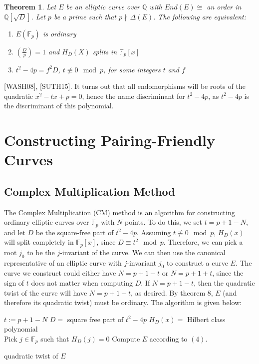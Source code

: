 \documentclass[12pt,twoside]{article}
\newcommand{\legendre}[2]{\genfrac{(}{)}{}{}{#1}{#2}}
\newtheorem{theorem}{Theorem}
\begin{document}
\begin{theorem}
Let $E$ be an elliptic curve over $\mathbb Q$ with $End(E) \cong $ an order in $\mathbb Q[\sqrt D]$. Let $p$ be a prime such that $p \nmid \, \Delta(E)$. The following are equivalent:
\begin{enumerate} 
\item $E(\mathbb F_p)$ is ordinary
\item $\legendre{D}{p} = 1$ and $H_D(X)$ splits in $\mathbb F_p[x]$
\item $t^2 - 4p = f^2 D$, $t \not \equiv 0 \mod p$, for some integers $t$ and $f$
\end{enumerate}
\end{theorem}
[WASH08], [SUTH15].
It turns out that all endomorphisms will be roots of the quadratic $x^{2} - tx + p = 0$, hence the name discriminant for $t^{2} - 4p$, as $t^2 - 4p$ is the discriminant of this polynomial.


\section{Constructing Pairing-Friendly Curves} 

\subsection{Complex Multiplication Method} 

The Complex Multiplication (CM) method is an algorithm for constructing ordinary elliptic curves over $\mathbb F_p$ with $N$ points. To do this, we set $t = p+1 - N$, and let $D$ be the square-free part of $t^2-4p$. Assuming $t \not \equiv 0 \mod p$, $H_{D}(x)$ will split completely in $\mathbb F_p[x]$, since $D \equiv t^2 \mod p$. Therefore, we can pick a root $j_0$ to be the $j$-invariant of the curve. We can then use the canonical representative of an elliptic curve with $j$-invariant $j_0$ to construct a curve $E$. The curve we construct could either have $N = p+1 - t$ or $N= p+1 + t$, since the sign of $t$ does not matter when computing $D$. If $N = p+1 -t$, then the quadratic twist of the curve will have $N = p+1 -t$, as desired. By theorem 8, $E$ (and therefore its quadratic twist) must be ordinary. The algorithm is given below:

\begin{algorithm}[H]
 $t := p+1 - N$\; 
 $D = $ square free part of $t^2-4p$\;
 $H_D(x) = $ Hilbert class polynomial \\
 Pick $j \in \mathbb F_p$ such that $H_D(j) = 0$
 Compute $E$ according to $(4)$.
 
  {
 }
 {\Return quadratic twist of $E$}
 \end{algorithm}
 \bigskip
 
\end{document}
